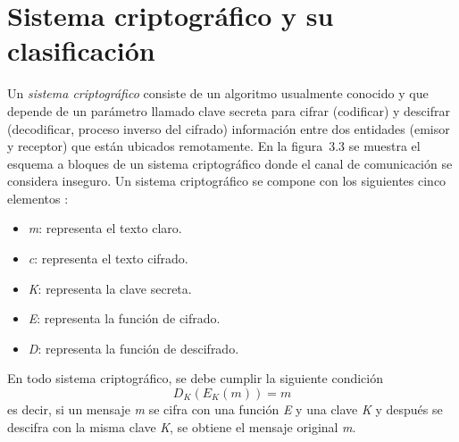 \section{Sistema criptográfico y su clasificación}
Un \textit{sistema criptográfico} consiste de un algoritmo usualmente conocido y que depende de un parámetro llamado clave secreta para cifrar (codificar) y descifrar (decodificar, proceso inverso del cifrado) información entre dos entidades (emisor y receptor) que están ubicados remotamente. En la figura~3.3 se muestra el esquema a bloques de un sistema criptográfico donde el canal de comunicación se considera inseguro. Un sistema criptográfico se compone con los siguientes cinco elementos \cite{KyS_1997}:
\begin{itemize}
\item \textit{m}: representa el texto claro.
\item \textit{c}: representa el texto cifrado.
\item \textit{K}: representa la clave secreta.
\item \textit{E}: representa la función de cifrado.
\item \textit{D}: representa la función de descifrado. \\
\end{itemize}

En todo sistema criptográfico, se debe cumplir la siguiente condición
\begin{equation}
D_{K}(E_{K}(m))=m
\end{equation}
es decir, si un mensaje \textit{m} se cifra con una función \textit{E} y una clave \textit{K} y después se descifra con la misma clave \textit{K}, se obtiene el mensaje original \textit{m}. \\

